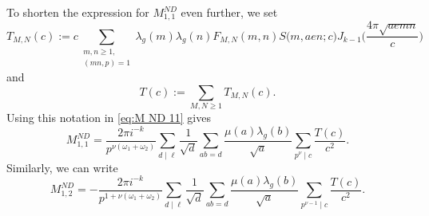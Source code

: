 \documentclass[12pt]{amsart}
\theoremstyle{plain}
\theoremstyle{definition}
\begin{document}
To shorten the expression for $M^{ND}_{1, 1}$ even further, we set
    \begin{equation}\label{eq:T M N c}
    T_{M, N}(c):=
    c \sum_{\substack{m, n \geq 1,\\ (mn, p)=1}}
    \lambda_g(m) \lambda_g(n)
    F_{M, N}(m, n) S\big(m, aen ; c\big)
    J_{k-1}\Big(\frac{4\pi\sqrt{aemn}}{c}\Big)  
    \end{equation}   
    and
    \[
    T(c):= \sum_{M, N \geq 1} T_{M, N}(c).
    \]
Using this notation in \eqref{eq:M ND 11} gives
    \begin{equation}\label{eq:MND in Tc}
    M^{ND}_{1, 1} 
    = \frac{2\pi i^{-k}}{ p^{\nu(\omega_1+\omega_2)} }
     \sum_{d\mid \ell} \frac{1}{\sqrt d} 
      \sum_{ab=d}
     \frac{\mu(a) \lambda_g(b)}{\sqrt a}
     \sum_{p^\nu \mid c} \frac{T(c)}{c^2}.
     \end{equation}
    Similarly, we can write
    \begin{equation}\label{eq:MND in Tc 12}
    M^{ND}_{1, 2} 
    = -\frac{2\pi i^{-k}}{p^{1+\nu(\omega_1+\omega_2)}}  
     \sum_{d\mid \ell} \frac{1}{\sqrt d} 
      \sum_{ab=d}
     \frac{\mu(a) \lambda_g(b)}{\sqrt a} \sum_{p^{\nu-1} \mid c} \frac{T(c)}{c^2} .
    \end{equation}

\end{document}
